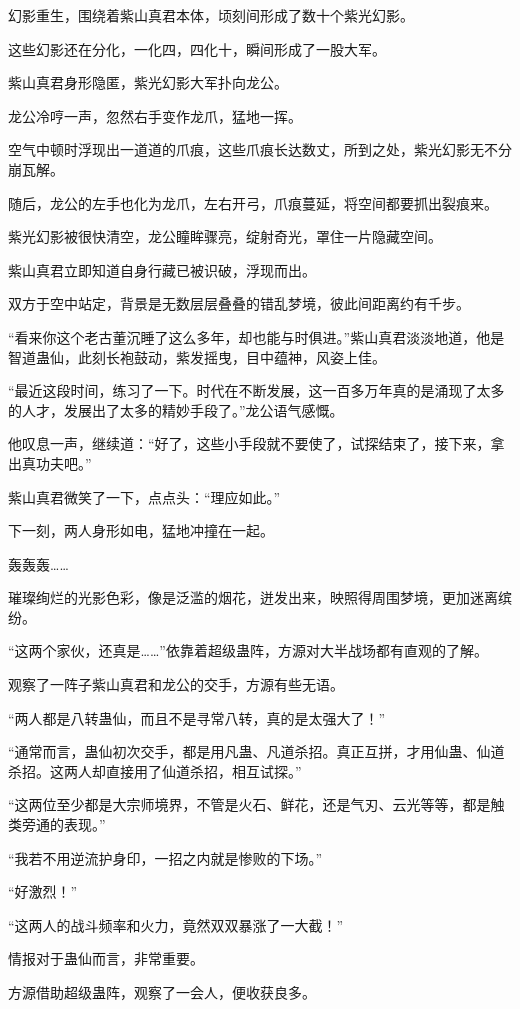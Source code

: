 \begin{this_body}
幻影重生，围绕着紫山真君本体，顷刻间形成了数十个紫光幻影。

这些幻影还在分化，一化四，四化十，瞬间形成了一股大军。

紫山真君身形隐匿，紫光幻影大军扑向龙公。

龙公冷哼一声，忽然右手变作龙爪，猛地一挥。

空气中顿时浮现出一道道的爪痕，这些爪痕长达数丈，所到之处，紫光幻影无不分崩瓦解。

随后，龙公的左手也化为龙爪，左右开弓，爪痕蔓延，将空间都要抓出裂痕来。

紫光幻影被很快清空，龙公瞳眸骤亮，绽射奇光，罩住一片隐藏空间。

紫山真君立即知道自身行藏已被识破，浮现而出。

双方于空中站定，背景是无数层层叠叠的错乱梦境，彼此间距离约有千步。

“看来你这个老古董沉睡了这么多年，却也能与时俱进。”紫山真君淡淡地道，他是智道蛊仙，此刻长袍鼓动，紫发摇曳，目中蕴神，风姿上佳。

“最近这段时间，练习了一下。时代在不断发展，这一百多万年真的是涌现了太多的人才，发展出了太多的精妙手段了。”龙公语气感慨。

他叹息一声，继续道：“好了，这些小手段就不要使了，试探结束了，接下来，拿出真功夫吧。”

紫山真君微笑了一下，点点头：“理应如此。”

下一刻，两人身形如电，猛地冲撞在一起。

轰轰轰……

璀璨绚烂的光影色彩，像是泛滥的烟花，迸发出来，映照得周围梦境，更加迷离缤纷。

“这两个家伙，还真是……”依靠着超级蛊阵，方源对大半战场都有直观的了解。

观察了一阵子紫山真君和龙公的交手，方源有些无语。

“两人都是八转蛊仙，而且不是寻常八转，真的是太强大了！”

“通常而言，蛊仙初次交手，都是用凡蛊、凡道杀招。真正互拼，才用仙蛊、仙道杀招。这两人却直接用了仙道杀招，相互试探。”

“这两位至少都是大宗师境界，不管是火石、鲜花，还是气刃、云光等等，都是触类旁通的表现。”

“我若不用逆流护身印，一招之内就是惨败的下场。”

“好激烈！”

“这两人的战斗频率和火力，竟然双双暴涨了一大截！”

情报对于蛊仙而言，非常重要。

方源借助超级蛊阵，观察了一会人，便收获良多。


\end{this_body}
